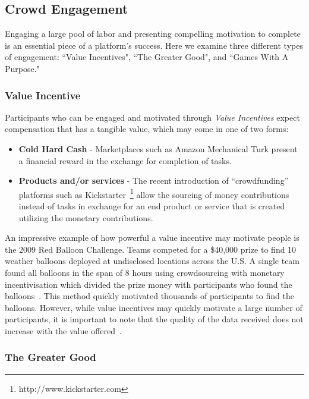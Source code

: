 \documentclass[10pt,twocolumn]{article}
\begin{document}
\subsection{Crowd Engagement}
\label{sec:engagement}

Engaging a large pool of labor and presenting compelling motivation to complete
is an essential piece of a platform's success. Here we examine three different
types of engagement: ``Value Incentives", ``The Greater Good", and ``Games With A 
Purpose."

\subsubsection*{Value Incentive}

Participants who can be engaged and motivated through \textit{Value Incentives} 
expect compensation that has a tangible value, which may come in one of two
forms:

\begin{itemize}
	\item
		\textbf{Cold Hard Cash} - Marketplaces such as Amazon Mechanical Turk
		present a financial reward in the exchange for completion of tasks.
	\item
		\textbf{Products and/or services} - The recent introduction of 
		``crowdfunding''~\cite{Belleflamme2011,Schwienbacher2010} platforms 
		such as Kickstarter~\footnote{http://www.kickstarter.com} allow the
		sourcing of money contributions instead of tasks in exchange for an 
		end product or service that is created utilizing the monetary
		contributions.
\end{itemize}

An impressive example of how powerful a value incentive may motivate people is
the 2009 Red Balloon Challenge. Teams competed for a \$40,000 prize to find 
10 weather balloons deployed at undisclosed locations across the U.S. A single
team found all balloons in the span of 8 hours using crowdsourcing with 
monetary incentivisation which divided the prize money with participants who
found the balloons~\cite{Tang2011}. This method quickly motivated thousands of 
participants to find the balloons. However, while value incentives may quickly 
motivate a large number of participants, it is important to note that the quality 
of the data received does not increase with the value offered~\cite{Mason2010a}.

\subsubsection*{The Greater Good}
\end{document}

